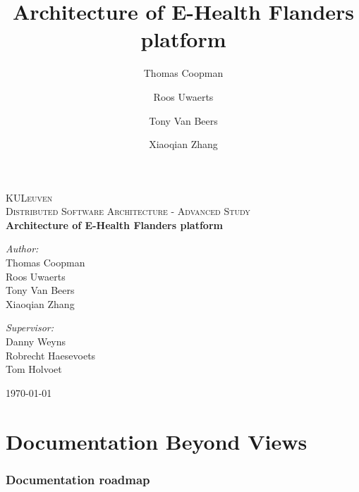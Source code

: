 \documentclass[a4paper,10pt]{article}
\title{Architecture of E-Health Flanders platform}
\author{Thomas Coopman \and Roos Uwaerts \and Tony Van Beers \and Xiaoqian Zhang}
\begin{document}
\begin{titlepage}
 
\begin{center}
 
 
 
\textsc{\LARGE KULeuven}\\[1.5cm]
 
\textsc{\Large Distributed Software Architecture - Advanced Study}\\[0.5cm]
 
 
{ \huge \bfseries Architecture of E-Health Flanders platform}\\[0.4cm]
 
 
\begin{minipage}{0.4\textwidth}
\begin{flushleft} \large
\emph{Author:}\\
Thomas Coopman\\ 
Roos Uwaerts\\
Tony Van Beers\\
Xiaoqian Zhang
\end{flushleft}
\end{minipage}
\begin{minipage}{0.4\textwidth}
\begin{flushright} \large
\emph{Supervisor:} \\
Danny Weyns\\
Robrecht Haesevoets\\
Tom Holvoet\\
\end{flushright}
\end{minipage}
 
\vfill
 
{\large \today}
 
\end{center}
 
\end{titlepage}

\clearpage

\part{Documentation Beyond Views}

\clearpage
\section{Documentation roadmap}
\end{document}
